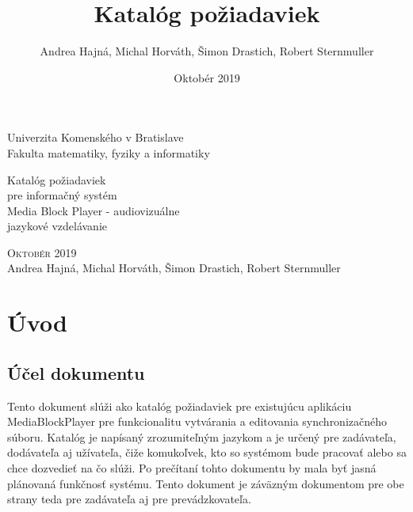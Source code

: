 \documentclass{article}
\title{Katalóg požiadaviek}
\author{Andrea Hajná, Michal Horváth, Šimon Drastich, Robert Sternmuller}
\date{Oktobér 2019}
\begin{document}


\thispagestyle{empty}

\begin{center}
\sc\large
Univerzita Komenského v Bratislave\\
Fakulta matematiky, fyziky a informatiky


\vfill

{\huge Katalóg požiadaviek \\ pre informačný systém}\\
Media Block Player - audiovizuálne \\ jazykové vzdelávanie
\end{center}

\vfill

{
\noindent
\textsc{Oktobér 2019}\\
Andrea Hajná, Michal Horváth, Šimon Drastich, Robert Sternmuller
}

\newpage


\tableofcontents

\newpage


\section{Úvod}

\subsection{Účel dokumentu }
 Tento dokument slúži ako katalóg požiadaviek pre existujúcu aplikáciu MediaBlockPlayer pre funkcionalitu vytvárania a editovania synchronizačného súboru. Katalóg je napísaný zrozumiteľným jazykom a je určený pre zadávateľa, dodávateľa aj užívateľa, čiže komukoľvek, kto so systémom bude pracovať alebo sa chce dozvedieť na čo slúži. Po prečítaní tohto dokumentu by mala byť jasná plánovaná funkčnosť systému.
Tento dokument je záväzným dokumentom pre obe strany teda pre zadávateľa aj pre prevádzkovateľa.
\end{document}
